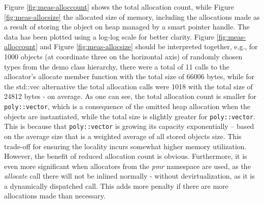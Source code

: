 \documentclass[a4paper,12pt]{article}
\begin{document}
Figure \ref{fig:meas-alloccount} shows the total allocation count, while Figure \ref{fig:meas-allocsize} the allocated size of memory, including the allocations made as a result of storing the object on heap managed by a smart pointer handle.  The data has been plotted using a log-log scale for better clarity. 
Figure \ref{fig:meas-alloccount} and Figure \ref{fig:meas-allocsize} should be interpreted together, e.g., for 1000 objects  (at coordinate three on the horizontal axis) of randomly chosen types from the demo class hierarchy, there were a total of 11 calls to the allocator's allocate member function with the total size of 66006 bytes, while for the std::vec alternative the total allocation calls were 1018 with the total size of 24812 bytes - on average. 
As one can see, the total allocation count is smaller for \lstinline{poly::vector}, which is a consequence of the omitted heap allocation when the objects are instantiated, while the total size is slightly greater for \lstinline{poly::vector}. This is because  that \lstinline{poly::vector} is growing its capacity exponentially -- based on the average size that is a weighted average of all stored objects size. This trade-off for ensuring the locality incurs somewhat higher memory utilization. However, the benefit of reduced allocation count is obvious. Furthermore, it is even more significant when allocators from the \emph{pmr} namespace  are used, as the \emph{allocate} call there will not be inlined normally - without devirtualization, as it is a dynamically dispatched call. This adds more penalty if there are more allocations made than necessary.
\end{document}
